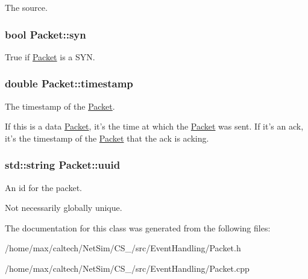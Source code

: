 \-The source. 

\hypertarget{classPacket_ad27cb1ca949aa1dece5a14d0cc734a8e}{
\subsubsection[{syn}]{\setlength{\rightskip}{0pt plus 5cm}bool {\bf \-Packet\-::syn}}}\label{classPacket_ad27cb1ca949aa1dece5a14d0cc734a8e}


\-True if \hyperlink{classPacket}{\-Packet} is a \-S\-Y\-N. 

\hypertarget{classPacket_a3c6b8af8bd18da132511da84aaba3acb}{
\subsubsection[{timestamp}]{\setlength{\rightskip}{0pt plus 5cm}double {\bf \-Packet\-::timestamp}}}\label{classPacket_a3c6b8af8bd18da132511da84aaba3acb}


\-The timestamp of the \hyperlink{classPacket}{\-Packet}. 

\-If this is a data \hyperlink{classPacket}{\-Packet}, it's the time at which the \hyperlink{classPacket}{\-Packet} was sent. \-If it's an ack, it's the timestamp of the \hyperlink{classPacket}{\-Packet} that the ack is acking. \hypertarget{classPacket_acaefdb9f910265a1ff97b522a780f088}{
\subsubsection[{uuid}]{\setlength{\rightskip}{0pt plus 5cm}std\-::string {\bf \-Packet\-::uuid}}}\label{classPacket_acaefdb9f910265a1ff97b522a780f088}


\-An id for the packet. 

\-Not necessarily globally unique. 

\-The documentation for this class was generated from the following files\-:\begin{DoxyCompactItemize}
\item 
/home/max/caltech/\-Net\-Sim/\-C\-S\-\_/src/\-Event\-Handling/\-Packet.\-h\item 
/home/max/caltech/\-Net\-Sim/\-C\-S\-\_/src/\-Event\-Handling/\-Packet.\-cpp\end{DoxyCompactItemize}
